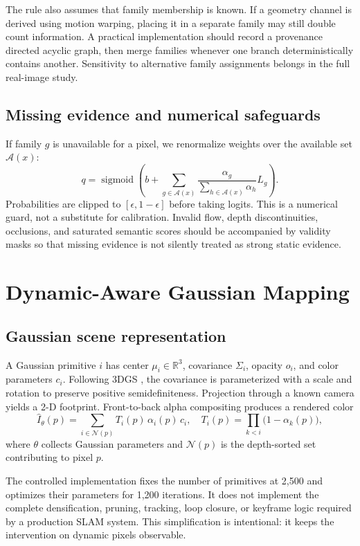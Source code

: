 \documentclass[10pt,conference]{IEEEtran}
\newcommand{\sigmoid}{\operatorname{sigmoid}}
\newcommand{\R}{\mathbb{R}}
\begin{document}
The rule also assumes that family membership is known. If a geometry channel is derived using motion warping, placing it in a separate family may still double count information. A practical implementation should record a provenance directed acyclic graph, then merge families whenever one branch deterministically contains another. Sensitivity to alternative family assignments belongs in the full real-image study.

\subsection{Missing evidence and numerical safeguards}
If family $g$ is unavailable for a pixel, we renormalize weights over the available set $\mathcal A(x)$:
\begin{equation}
q=\sigmoid\left(b+\sum_{g\in\mathcal A(x)}
\frac{\alpha_g}{\sum_{h\in\mathcal A(x)}\alpha_h}L_g\right).
\label{eq:missing}
\end{equation}
Probabilities are clipped to $[\epsilon,1-\epsilon]$ before taking logits. This is a numerical guard, not a substitute for calibration. Invalid flow, depth discontinuities, occlusions, and saturated semantic scores should be accompanied by validity masks so that missing evidence is not silently treated as strong static evidence.

\section{Dynamic-Aware Gaussian Mapping}
\subsection{Gaussian scene representation}
A Gaussian primitive $i$ has center $\mu_i\in\R^3$, covariance $\Sigma_i$, opacity $o_i$, and color parameters $c_i$. Following 3DGS \cite{kerbl2023}, the covariance is parameterized with a scale and rotation to preserve positive semidefiniteness. Projection through a known camera yields a 2-D footprint. Front-to-back alpha compositing produces a rendered color
\begin{equation}
\hat I_\theta(p)=\sum_{i\in\mathcal N(p)}T_i(p)\,\alpha_i(p)\,c_i,
\quad
T_i(p)=\prod_{k<i}\bigl(1-\alpha_k(p)\bigr),
\label{eq:render}
\end{equation}
where $\theta$ collects Gaussian parameters and $\mathcal N(p)$ is the depth-sorted set contributing to pixel $p$.

The controlled implementation fixes the number of primitives at 2,500 and optimizes their parameters for 1,200 iterations. It does not implement the complete densification, pruning, tracking, loop closure, or keyframe logic required by a production SLAM system. This simplification is intentional: it keeps the intervention on dynamic pixels observable.
\end{document}
